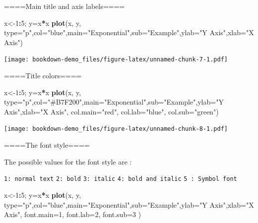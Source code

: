 \documentclass[]{book}
\newenvironment{Shaded}{\begin{snugshade}}{\end{snugshade}}
\newcommand{\KeywordTok}[1]{\textcolor[rgb]{0.13,0.29,0.53}{\textbf{#1}}}
\newcommand{\DataTypeTok}[1]{\textcolor[rgb]{0.13,0.29,0.53}{#1}}
\newcommand{\DecValTok}[1]{\textcolor[rgb]{0.00,0.00,0.81}{#1}}
\newcommand{\StringTok}[1]{\textcolor[rgb]{0.31,0.60,0.02}{#1}}
\newcommand{\OperatorTok}[1]{\textcolor[rgb]{0.81,0.36,0.00}{\textbf{#1}}}
\newcommand{\NormalTok}[1]{#1}
\begin{document}
====Main title and axis labels====

\begin{Shaded}
\begin{Highlighting}[]
\NormalTok{x<-}\DecValTok{1}\OperatorTok{:}\DecValTok{5}\NormalTok{; y=x}\OperatorTok{*}\NormalTok{x}
\KeywordTok{plot}\NormalTok{(x, y, }\DataTypeTok{type=}\StringTok{"p"}\NormalTok{,}\DataTypeTok{col=}\StringTok{"blue"}\NormalTok{,}\DataTypeTok{main=}\StringTok{"Exponential"}\NormalTok{,}\DataTypeTok{sub=}\StringTok{"Example"}\NormalTok{,}\DataTypeTok{ylab=}\StringTok{"Y Axis"}\NormalTok{,}\DataTypeTok{xlab=}\StringTok{"X Axis"}\NormalTok{)}
\end{Highlighting}
\end{Shaded}

\texttt{[image: bookdown-demo\_files/figure-latex/unnamed-chunk-7-1.pdf]}

====Title colors====

\begin{Shaded}
\begin{Highlighting}[]
\NormalTok{x<-}\DecValTok{1}\OperatorTok{:}\DecValTok{5}\NormalTok{; y=x}\OperatorTok{*}\NormalTok{x}
\KeywordTok{plot}\NormalTok{(x, y, }\DataTypeTok{type=}\StringTok{"p"}\NormalTok{,}\DataTypeTok{col=}\StringTok{"#B7F200"}\NormalTok{,}\DataTypeTok{main=}\StringTok{"Exponential"}\NormalTok{,}\DataTypeTok{sub=}\StringTok{"Example"}\NormalTok{,}\DataTypeTok{ylab=}\StringTok{"Y Axis"}\NormalTok{,}\DataTypeTok{xlab=}\StringTok{"X Axis"}\NormalTok{,}
     \DataTypeTok{col.main=}\StringTok{"red"}\NormalTok{, }\DataTypeTok{col.lab=}\StringTok{"blue"}\NormalTok{, }\DataTypeTok{col.sub=}\StringTok{"green"}\NormalTok{)}
\end{Highlighting}
\end{Shaded}

\texttt{[image: bookdown-demo\_files/figure-latex/unnamed-chunk-8-1.pdf]}

====The font style====

The possible values for the font style are :

\texttt{1:\ normal\ text} \texttt{2:\ bold} \texttt{3:\ italic}
\texttt{4:\ bold\ and\ italic} \texttt{5\ :\ Symbol\ font}

\begin{Shaded}
\begin{Highlighting}[]
\NormalTok{x<-}\DecValTok{1}\OperatorTok{:}\DecValTok{5}\NormalTok{; y=x}\OperatorTok{*}\NormalTok{x}
\KeywordTok{plot}\NormalTok{(x, y, }\DataTypeTok{type=}\StringTok{"p"}\NormalTok{,}\DataTypeTok{col=}\StringTok{"blue"}\NormalTok{,}\DataTypeTok{main=}\StringTok{"Exponential"}\NormalTok{,}\DataTypeTok{sub=}\StringTok{"Example"}\NormalTok{,}\DataTypeTok{ylab=}\StringTok{"Y Axis"}\NormalTok{,}\DataTypeTok{xlab=}\StringTok{"X Axis"}\NormalTok{,}
     \DataTypeTok{font.main=}\DecValTok{1}\NormalTok{, }\DataTypeTok{font.lab=}\DecValTok{2}\NormalTok{, }\DataTypeTok{font.sub=}\DecValTok{3}
\NormalTok{     )}
\end{Highlighting}
\end{Shaded}
\end{document}
